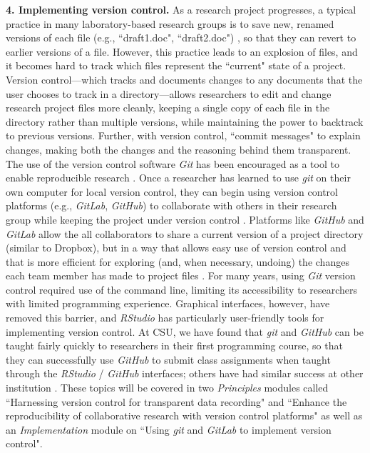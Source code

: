 \documentclass[pdftex,english,11pt,parskip=half]{scrartcl}
\begin{document}
\textbf{4. Implementing version control.} As a research project progresses, a typical practice in many laboratory-based research groups is to save new, renamed versions of each file (e.g., ``draft1.doc", ``draft2.doc") \cite{bryan2018excuse}, so that they can revert to earlier versions of a file. However, this practice leads to an explosion of files, and it becomes hard to track which files represent the ``current" state of a project. Version control---which tracks and documents changes to any documents that the user chooses to track in a directory---allows researchers to edit and change research project files more cleanly, keeping a single copy of each file in the directory rather than multiple versions, while maintaining the power to backtrack to previous versions. Further, with version control, ``commit messages" to explain changes, making both the changes and the reasoning behind them transparent. The use of the version control software \textit{Git} has been encouraged as a tool to enable reproducible research \cite{piccolo2016tools, ram2013git, bryan2018excuse, lowndes2017our, cetinkaya2017infrastructure}. Once a researcher has learned to use \textit{git} on their own computer for local version control, they can begin using version control 
platforms (e.g., \textit{GitLab}, \textit{GitHub}) to collaborate with others in their research
group while keeping the project under version control \cite{bryan2018excuse, shade2015computing}. Platforms like \textit{GitHub} and \textit{GitLab} allow
the all collaborators to share a current version of a project directory 
(similar to Dropbox), but in a way that allows easy use of version control 
and that is more efficient for exploring (and, when necessary, undoing) the changes 
each team member has made to project files \cite{bryan2018excuse}. For many years, using \textit{Git} version control required use of the command line,
limiting its accessibility to researchers with limited programming experience.
Graphical interfaces, however, have removed this barrier, and \textit{RStudio} has 
particularly user-friendly tools for implementing version control. At CSU, we have found that \textit{git} and \textit{GitHub} can be taught fairly quickly to researchers in their first programming course, so that they can successfully use \textit{GitHub} to submit class assignments when taught through the \textit{RStudio} / \textit{GitHub} interfaces; others have had similar success at other institution \cite{bryan2018excuse}. These
topics will be covered in two \textit{Principles} modules called ``Harnessing
version control for transparent data recording" and ``Enhance the
reproducibility of collaborative research with version control platforms" as
well as an \textit{Implementation} module on ``Using \textit{git} and \textit{GitLab} to implement
version control". 
\end{document}
